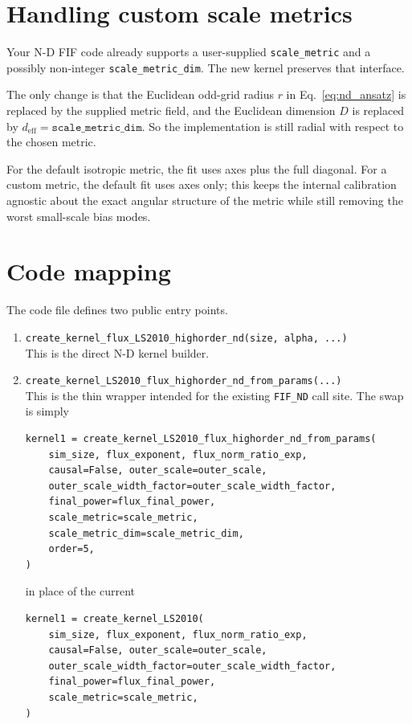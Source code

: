 \documentclass[11pt]{article}
\begin{document}
\section{Handling custom scale metrics}

Your N-D FIF code already supports a user-supplied \texttt{scale\_metric} and a
possibly non-integer \texttt{scale\_metric\_dim}.  The new kernel preserves that
interface.

The only change is that the Euclidean odd-grid radius $r$ in
Eq.~\eqref{eq:nd_ansatz} is replaced by the supplied metric field, and the
Euclidean dimension $D$ is replaced by
\(d_{\mathrm{eff}} = \texttt{scale\_metric\_dim}\).
So the implementation is still radial with respect to the chosen metric.

For the default isotropic metric, the fit uses axes plus the full diagonal.  For a
custom metric, the default fit uses axes only; this keeps the internal calibration
agnostic about the exact angular structure of the metric while still removing the
worst small-scale bias modes.

\section{Code mapping}

The code file defines two public entry points.

\begin{enumerate}
\item
\texttt{create\_kernel\_flux\_LS2010\_highorder\_nd(size, alpha, ...)}\\
This is the direct N-D kernel builder.

\item
\texttt{create\_kernel\_LS2010\_flux\_highorder\_nd\_from\_params(...)}\\
This is the thin wrapper intended for the existing \texttt{FIF\_ND} call site.
The swap is simply
\begin{verbatim}
kernel1 = create_kernel_LS2010_flux_highorder_nd_from_params(
    sim_size, flux_exponent, flux_norm_ratio_exp,
    causal=False, outer_scale=outer_scale,
    outer_scale_width_factor=outer_scale_width_factor,
    final_power=flux_final_power,
    scale_metric=scale_metric,
    scale_metric_dim=scale_metric_dim,
    order=5,
)
\end{verbatim}
in place of the current
\begin{verbatim}
kernel1 = create_kernel_LS2010(
    sim_size, flux_exponent, flux_norm_ratio_exp,
    causal=False, outer_scale=outer_scale,
    outer_scale_width_factor=outer_scale_width_factor,
    final_power=flux_final_power,
    scale_metric=scale_metric,
)
\end{verbatim}
\end{enumerate}
\end{document}
